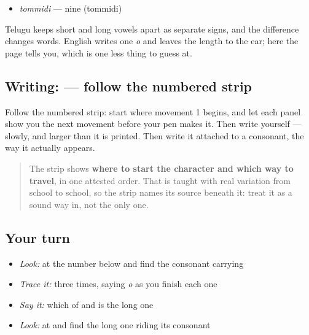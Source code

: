 \begin{itemize}
\raggedright
  \item \textbf{} \emph{tommidi} — nine (tommidi)
\end{itemize}

Telugu keeps short and long vowels apart as separate signs, and the difference changes words. English writes one \emph{o} and leaves the length to the ear; here the page tells you, which is one less thing to guess at.

\subsection*{Writing:  — follow the numbered strip}

Follow the numbered strip: start where movement 1 begins, and let each panel show you the next movement before your pen makes it. Then write  yourself — slowly, and larger than it is printed. Then write it attached to a consonant, the way it actually appears.

\begin{quote}
The strip shows \textbf{where to start the character and which way to travel}, in one attested order. That is taught with real variation from school to school, so the strip names its source beneath it: treat it as a sound way in, not the only one.
\end{quote}

\subsection*{Your turn}
\begin{itemize}
\raggedright
  \item \emph{Look:} at the number below and find the consonant carrying 
\end{itemize}

\begin{quote}
\end{quote}

\begin{itemize}
\raggedright
  \item \emph{Trace it:}  three times, saying \emph{o} as you finish each one
  \item \emph{Say it:} which of  and  is the long one
  \item \emph{Look:} at  and find the long one riding its consonant
\end{itemize}

